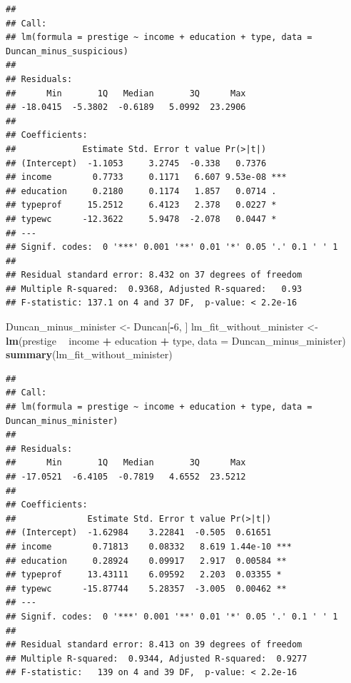 \documentclass[]{extarticle}
\newenvironment{Shaded}{\begin{snugshade}}{\end{snugshade}}
\newcommand{\KeywordTok}[1]{\textcolor[rgb]{0.13,0.29,0.53}{\textbf{#1}}}
\newcommand{\DataTypeTok}[1]{\textcolor[rgb]{0.13,0.29,0.53}{#1}}
\newcommand{\DecValTok}[1]{\textcolor[rgb]{0.00,0.00,0.81}{#1}}
\newcommand{\StringTok}[1]{\textcolor[rgb]{0.31,0.60,0.02}{#1}}
\newcommand{\OperatorTok}[1]{\textcolor[rgb]{0.81,0.36,0.00}{\textbf{#1}}}
\newcommand{\NormalTok}[1]{#1}
\begin{document}
\begin{verbatim}
## 
## Call:
## lm(formula = prestige ~ income + education + type, data = Duncan_minus_suspicious)
## 
## Residuals:
##      Min       1Q   Median       3Q      Max 
## -18.0415  -5.3802  -0.6189   5.0992  23.2906 
## 
## Coefficients:
##             Estimate Std. Error t value Pr(>|t|)    
## (Intercept)  -1.1053     3.2745  -0.338   0.7376    
## income        0.7733     0.1171   6.607 9.53e-08 ***
## education     0.2180     0.1174   1.857   0.0714 .  
## typeprof     15.2512     6.4123   2.378   0.0227 *  
## typewc      -12.3622     5.9478  -2.078   0.0447 *  
## ---
## Signif. codes:  0 '***' 0.001 '**' 0.01 '*' 0.05 '.' 0.1 ' ' 1
## 
## Residual standard error: 8.432 on 37 degrees of freedom
## Multiple R-squared:  0.9368, Adjusted R-squared:   0.93 
## F-statistic: 137.1 on 4 and 37 DF,  p-value: < 2.2e-16
\end{verbatim}

\begin{Shaded}
\begin{Highlighting}[]
\NormalTok{Duncan_minus_minister <-}\StringTok{ }\NormalTok{Duncan[}\OperatorTok{-}\DecValTok{6}\NormalTok{, ]}
\NormalTok{lm_fit_without_minister <-}\StringTok{ }\KeywordTok{lm}\NormalTok{(prestige }\OperatorTok{~}\StringTok{ }\NormalTok{income }\OperatorTok{+}\StringTok{ }\NormalTok{education }\OperatorTok{+}\StringTok{ }\NormalTok{type, }\DataTypeTok{data =}\NormalTok{ Duncan_minus_minister)}
\KeywordTok{summary}\NormalTok{(lm_fit_without_minister)}
\end{Highlighting}
\end{Shaded}

\begin{verbatim}
## 
## Call:
## lm(formula = prestige ~ income + education + type, data = Duncan_minus_minister)
## 
## Residuals:
##      Min       1Q   Median       3Q      Max 
## -17.0521  -6.4105  -0.7819   4.6552  23.5212 
## 
## Coefficients:
##              Estimate Std. Error t value Pr(>|t|)    
## (Intercept)  -1.62984    3.22841  -0.505  0.61651    
## income        0.71813    0.08332   8.619 1.44e-10 ***
## education     0.28924    0.09917   2.917  0.00584 ** 
## typeprof     13.43111    6.09592   2.203  0.03355 *  
## typewc      -15.87744    5.28357  -3.005  0.00462 ** 
## ---
## Signif. codes:  0 '***' 0.001 '**' 0.01 '*' 0.05 '.' 0.1 ' ' 1
## 
## Residual standard error: 8.413 on 39 degrees of freedom
## Multiple R-squared:  0.9344, Adjusted R-squared:  0.9277 
## F-statistic:   139 on 4 and 39 DF,  p-value: < 2.2e-16
\end{verbatim}
\end{document}
